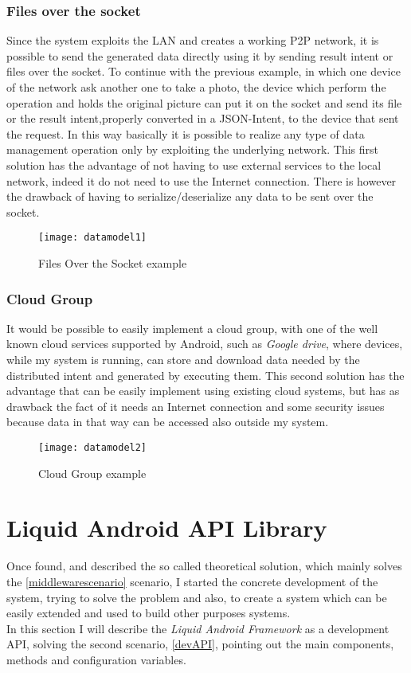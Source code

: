  \subsubsection{Files over the socket}\label{fos}
 Since the system exploits the LAN and creates a working P2P network, it is possible to send the generated data directly using it by sending result intent or files over the socket. To continue with the previous example, in which one device of the network ask another one to take a photo, the device which perform the operation and holds the original picture can put it on the socket and send its file or the result intent,properly converted in a JSON-Intent, to the device that sent the request. In this way basically it is possible to realize any type of data management operation only by exploiting the underlying network. This first solution has the advantage of not having to use external services to the local network, indeed it do not need to use the Internet connection. There is however the drawback of having to serialize/deserialize any data to be sent over the socket.
 \begin{figure}[h]
 	\centering
 	\texttt{[image: datamodel1]}
 	\caption{Files Over the Socket example}
 	\label{fig:4.5}
 \end{figure}
 \subsubsection{Cloud Group}
 It would be possible to easily implement a cloud group, with one of the well known cloud services supported by Android, such as \textit{Google drive}, where devices, while my system is running, can store and download data needed by the distributed intent and generated by executing them. This second solution has the advantage that can be easily implement using existing cloud systems, but has as drawback the fact of it needs an Internet connection and some security issues because data in that way can be accessed also outside my system.
 \begin{figure}[h]
 	\centering
 	\texttt{[image: datamodel2]}
 	\caption{Cloud Group example}
 	\label{fig:4.6}
 \end{figure}
\section{Liquid Android API Library}\label{API}
Once found, and described the so called theoretical solution, which mainly solves the \ref{middlewarescenario} scenario, I started the concrete development of the system, trying to solve the problem and also, to create a system which can be easily extended and used to build other purposes systems.\\
In this section I will describe the \textit{Liquid Android Framework} as a development API, solving the second scenario, \ref{devAPI}, pointing out the main components, methods and configuration variables.
